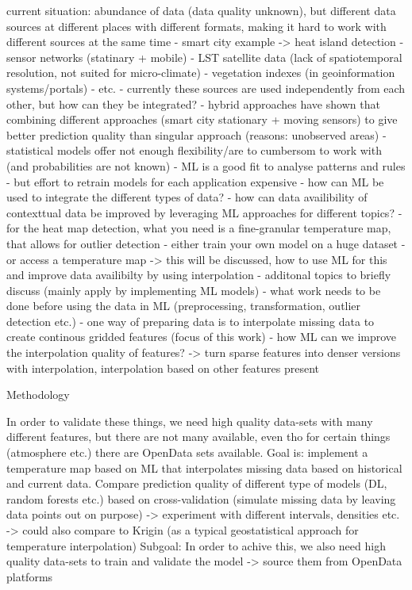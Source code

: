 current situation: abundance of data (data quality unknown), but different data sources at different places with different formats, making it hard to work with different sources at the same time
- smart city example -> heat island detection
    - sensor networks (statinary + mobile)
    - LST satellite data (lack of spatiotemporal resolution, not suited for micro-climate)
    - vegetation indexes (in geoinformation systems/portals)
    - etc.
- currently these sources are used independently from each other, but how can they be integrated?
    - hybrid approaches have shown that combining different approaches (smart city stationary + moving sensors) to give better prediction quality than singular approach (reasons: unobserved areas)
    - statistical models offer not enough flexibility/are to cumbersom to work with (and probabilities are not known)
    - ML is a good fit to analyse patterns and rules
        - but effort to retrain models for each application expensive
- how can ML be used to integrate the different types of data?
- how can data availibility of contexttual data be improved by leveraging ML approaches for different topics?
    - for the heat map detection, what you need is a fine-granular temperature map, that allows for outlier detection
        - either train your own model on a huge dataset
        - or access a temperature map -> this will be discussed, how to use ML for this and improve data availibilty by using interpolation
- additonal topics to briefly discuss (mainly apply by implementing ML models) 
    - what work needs to be done before using the data in ML (preprocessing, transformation, outlier detection etc.)
        - one way of preparing data is to interpolate missing data to create continous gridded features (focus of this work)
        - how ML can we improve the interpolation quality of features? -> turn sparse features into denser versions with interpolation, interpolation based on other features present

Methodology

In order to validate these things, we need high quality data-sets with many different features, but there are not many available, even tho for certain things (atmosphere etc.) there are OpenData sets available.
Goal is: implement a temperature map based on ML that interpolates missing data based on historical and current data.
Compare prediction quality of different type of models (DL, random forests etc.) based on cross-validation (simulate missing data by leaving data points out on purpose) -> experiment with different intervals, densities etc. -> could also compare to Krigin (as a typical geostatistical approach for temperature interpolation)
Subgoal: In order to achive this, we also need high quality data-sets to train and validate the model -> source them from OpenData platforms

